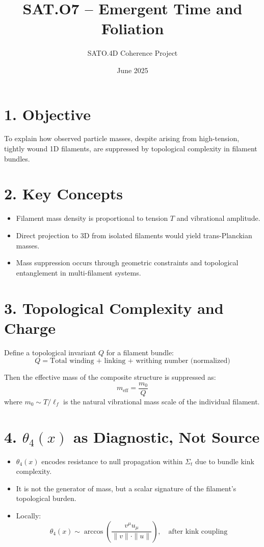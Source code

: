 \documentclass[12pt]{article}
\title{SAT.O7 – Emergent Time and Foliation}
\author{SATO.4D Coherence Project}
\date{June 2025}
\begin{document}
\maketitle

\section*{1. Objective}

To explain how observed particle masses, despite arising from high-tension, tightly wound 1D filaments, are suppressed by topological complexity in filament bundles.

\section*{2. Key Concepts}

\begin{itemize}
    \item Filament mass density is proportional to tension \( T \) and vibrational amplitude.
    \item Direct projection to 3D from isolated filaments would yield trans-Planckian masses.
    \item Mass suppression occurs through geometric constraints and topological entanglement in multi-filament systems.
\end{itemize}

\section*{3. Topological Complexity and Charge}

Define a topological invariant \( Q \) for a filament bundle:
\[
Q = \text{Total winding + linking + writhing number (normalized)}
\]

Then the effective mass of the composite structure is suppressed as:
\[
m_{\text{eff}} = \frac{m_0}{Q}
\]
where \( m_0 \sim T / \ell_f \) is the natural vibrational mass scale of the individual filament.

\section*{4. \(\theta_4(x)\) as Diagnostic, Not Source}

\begin{itemize}
    \item \(\theta_4(x)\) encodes resistance to null propagation within \( \Sigma_t \) due to bundle kink complexity.
    \item It is not the generator of mass, but a scalar signature of the filament's topological burden.
    \item Locally: 
    \[
    \theta_4(x) \sim \arccos\left( \frac{v^\mu u_\mu}{\|v\| \cdot \|u\|} \right), \quad \text{after kink coupling}
    \]
\end{itemize}
\end{document}
